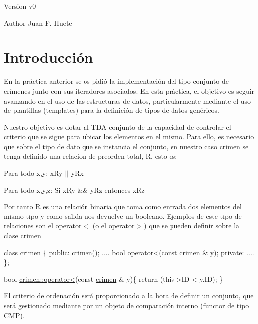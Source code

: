 \begin{DoxyVersion}{Version}
v0 
\end{DoxyVersion}
\begin{DoxyAuthor}{Author}
Juan F. Huete
\end{DoxyAuthor}
\hypertarget{index_intro_sec}{}\section{Introducción}\label{index_intro_sec}
En la práctica anterior se os pidió la implementación del tipo conjunto de crímenes junto con sus iteradores asociados. En esta práctica, el objetivo es seguir avanzando en el uso de las estructuras de datos, particularmente mediante el uso de plantillas (templates) para la definición de tipos de datos genéricos.

Nuestro objetivo es dotar al T\+D\+A conjunto de la capacidad de controlar el criterio que se sigue para ubicar los elementos en el mismo. Para ello, es necesario que sobre el tipo de dato que se instancia el conjunto, en nuestro caso crimen se tenga definido una relacion de preorden total, R, esto es\+:

\begin{DoxyItemize}
\item Para todo x,y\+: x\+Ry $\vert$$\vert$ y\+Rx \item Para todo x,y,z\+: Si x\+Ry \&\& y\+Rz entonces x\+Rz\end{DoxyItemize}
Por tanto R es una relación binaria que toma como entrada dos elementos del mismo tipo y como salida nos devuelve un booleano. Ejemplos de este tipo de relaciones son el operator$<$ (o el operator$>$) que se pueden definir sobre la clase crimen 
\begin{DoxyCode}
\textcolor{keyword}{class }\hyperlink{classcrimen}{crimen} \{
 \textcolor{keyword}{public}:
  \hyperlink{classcrimen_ab1147e36869c7e635699e4ef746a7555}{crimen}();
  ....
  \textcolor{keywordtype}{bool} \hyperlink{classcrimen_ac865fdb9712f2426d947b1b5546b50e5}{operator<}(\textcolor{keyword}{const} \hyperlink{classcrimen}{crimen} & y);
 \textcolor{keyword}{private}:
  ....
\};

\textcolor{keywordtype}{bool} \hyperlink{classcrimen_ac865fdb9712f2426d947b1b5546b50e5}{crimen::operator<}(\textcolor{keyword}{const} \hyperlink{classcrimen}{crimen} & y)\{
  \textcolor{keywordflow}{return} (this->ID < y.ID);
\}
\end{DoxyCode}


El criterio de ordenación será proporcionado a la hora de definir un conjunto, que será gestionado mediante por un objeto de comparación interno (functor de tipo C\+M\+P).


